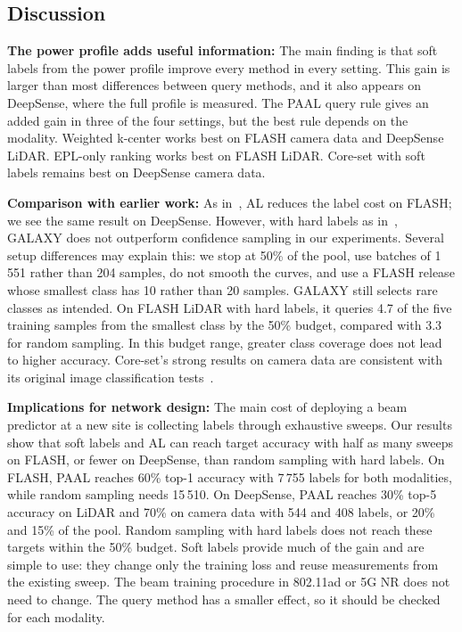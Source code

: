 \documentclass[journal,onecolumn]{IEEEtran}
\begin{document}
\subsection{Discussion}
\textbf{The power profile adds useful information:} The main finding is that soft labels from the power profile improve every method in every setting. This gain is larger than most differences between query methods, and it also appears on DeepSense, where the full profile is measured. The PAAL query rule gives an added gain in three of the four settings, but the best rule depends on the modality. Weighted k-center works best on FLASH camera data and DeepSense LiDAR. EPL-only ranking works best on FLASH LiDAR. Core-set with soft labels remains best on DeepSense camera data.

\textbf{Comparison with earlier work:} As in~\cite{soltani2024learning}, AL reduces the label cost on FLASH; we see the same result on DeepSense. However, with hard labels as in~\cite{soltani2024learning}, GALAXY does not outperform confidence sampling in our experiments. Several setup differences may explain this: we stop at 50\% of the pool, use batches of 1\,551 rather than 204 samples, do not smooth the curves, and use a FLASH release whose smallest class has 10 rather than 20 samples. GALAXY still selects rare classes as intended. On FLASH LiDAR with hard labels, it queries 4.7 of the five training samples from the smallest class by the 50\% budget, compared with 3.3 for random sampling. In this budget range, greater class coverage does not lead to higher accuracy. Core-set's strong results on camera data are consistent with its original image classification tests~\cite{sener2018coreset}.

\textbf{Implications for network design:} The main cost of deploying a beam predictor at a new site is collecting labels through exhaustive sweeps. Our results show that soft labels and AL can reach target accuracy with half as many sweeps on FLASH, or fewer on DeepSense, than random sampling with hard labels. On FLASH, PAAL reaches 60\% top-1 accuracy with 7\,755 labels for both modalities, while random sampling needs 15\,510. On DeepSense, PAAL reaches 30\% top-5 accuracy on LiDAR and 70\% on camera data with 544 and 408 labels, or 20\% and 15\% of the pool. Random sampling with hard labels does not reach these targets within the 50\% budget. Soft labels provide much of the gain and are simple to use: they change only the training loss and reuse measurements from the existing sweep. The beam training procedure in 802.11ad or 5G NR does not need to change. The query method has a smaller effect, so it should be checked for each modality.
\end{document}
